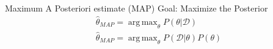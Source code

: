 \documentclass{beamer}
\newcommand{\data}{\mathcal{D}}
\DeclareMathOperator*{\argmax}{arg\,max}
\begin{document}
\begin{frame}{Maximum A Posteriori estimate (MAP)}
Goal: Maximize the Posterior
	\begin{align}
\hat{\theta}_{MAP} = \argmax_\theta P(\theta|\data)\\
\hat{\theta}_{MAP}= \argmax_\theta P(\data|\theta)P(\theta)
\end{align}

\end{frame}
%
%
%
%
%
%
% 
\end{document}
